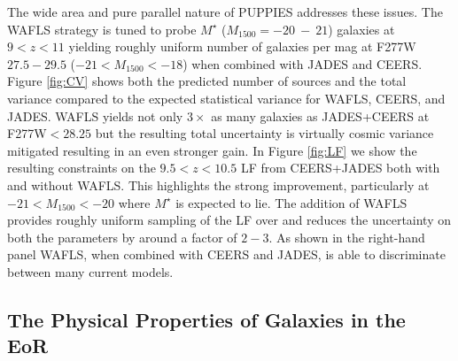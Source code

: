 \documentclass[12pt]{article}
\begin{document}
The wide area and pure parallel nature of PUPPIES addresses these issues. The WAFLS strategy is tuned to probe $M^{\star}$ ($M_{1500}=-20\ -\ 21$) galaxies at $9<z<11$ yielding roughly uniform number of galaxies per mag at F277W$27.5-29.5$ ($-21<M_{1500}<-18$) when combined with JADES and CEERS. Figure \ref{fig:CV} shows both the predicted number of sources and the total variance compared to the expected statistical variance for WAFLS, CEERS, and JADES. WAFLS yields not only $3\times$ as many galaxies as JADES+CEERS at F277W$<28.25$ but the resulting total uncertainty is virtually cosmic variance mitigated resulting in an even stronger gain. In Figure \ref{fig:LF} we show the resulting constraints on the $9.5<z<10.5$ LF from CEERS+JADES both with and without WAFLS. This highlights the strong improvement, particularly at $-21<M_{1500}<-20$ where $M^{\star}$ is expected to lie. The addition of WAFLS provides roughly uniform sampling of the LF over and reduces the uncertainty on both the parameters by around a factor of $2-3$. As shown in the right-hand panel WAFLS, when combined with CEERS and JADES, is able to discriminate between many current models. 


\subsection*{The Physical Properties of Galaxies in the EoR}\label{sec:properties}




\end{document}
